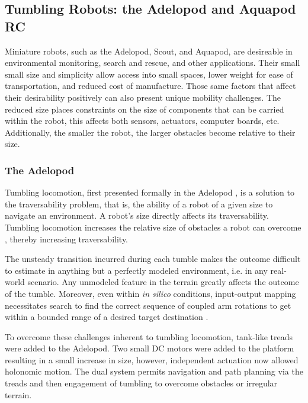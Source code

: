

	\subsection{Tumbling Robots: the Adelopod and Aquapod RC}
	\label{sec:adelopod_aquapodrc}

		Miniature robots, such as the Adelopod, Scout, and Aquapod, are desireable in environmental monitoring, search and rescue, and other applications. Their small small size and simplicity allow access into small spaces, lower weight for ease of transportation, and reduced cost of manufacture. Those same factors that affect their desirability positively can also present unique mobility challenges. The reduced size places constraints on the size of components that can be carried within the robot, this affects both sensors, actuators, computer boards, etc. Additionally, the smaller the robot, the larger obstacles become relative to their size. 

		\subsubsection{The Adelopod}
		Tumbling locomotion, first presented formally in the Adelopod \cite{Hemes2009}, is a solution to the traversability problem, that is, the ability of a robot of a given size to navigate an environment. A robot's size directly affects its traversability. Tumbling locomotion increases the relative size of obstacles a robot can overcome \cite{Hemes2011}, thereby increasing traversability. 

		The unsteady transition incurred during each tumble makes the outcome difficult to estimate in anything but a perfectly modeled environment, i.e. in any real-world scenario. Any unmodeled feature in the terrain greatly affects the outcome of the tumble. Moreover, even within \emph{in silico} conditions, input-output mapping necessitates search to find the correct sequence of coupled arm rotations to get within a bounded range of a desired target destination \cite{Hemes2008}. 

		To overcome these challenges inherent to tumbling locomotion, tank-like treads were added to the Adelopod. Two small DC motors were added to the platform resulting in a small increase in size, however, independent actuation now allowed holonomic motion. The dual system permits navigation and path planning via the treads and then engagement of tumbling to overcome obstacles or irregular terrain. 

